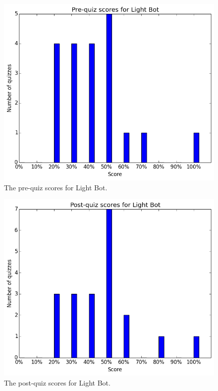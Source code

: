 			\begin{figure}[h!] 
			\centering 
			\includegraphics[height=0.33\textheight]{lightbot_pre.png} 
			\caption{The pre-quiz scores for Light Bot.}
			\end{figure}

			\begin{figure}[h!] 
			\centering 
			\includegraphics[height=0.33\textheight]{lightbot_post.png} 
			\caption{The post-quiz scores for Light Bot.}
			\end{figure}










